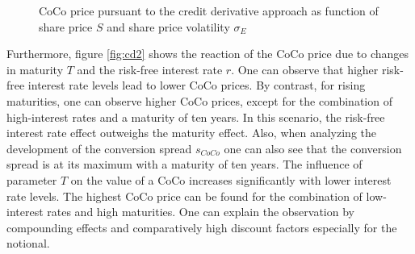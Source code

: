 \begin{figure}
\centering
{}
  \caption[CoCo price pursuant to the credit derivative approach as function of share price and share price volatility]{CoCo price pursuant to the credit derivative approach as function of share price $S$ and share price volatility $\sigma_E$}
  \label{fig:cd1}
  \end{figure}

Furthermore, figure \ref{fig:cd2} shows the reaction of the CoCo price due to changes in maturity $T$ and the risk-free interest rate $r$. One can observe that higher risk-free interest rate levels lead to lower CoCo prices. By contrast, for rising maturities, one can observe higher CoCo prices, except for the combination of high-interest rates and a maturity of ten years. In this scenario, the risk-free interest rate effect outweighs the maturity effect. Also, when analyzing the development of the conversion spread $s_{CoCo}$ one can also see that the conversion spread is at its maximum with a maturity of ten years. The influence of parameter $T$ on the value of a CoCo increases significantly with lower interest rate levels. The highest CoCo price can be found for the combination of low-interest rates and high maturities. One can explain the observation by compounding effects and comparatively high discount factors especially for the notional.  
  
